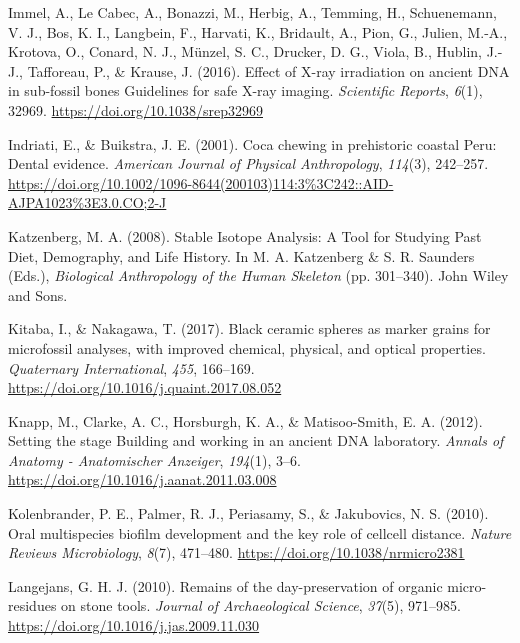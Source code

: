 \documentclass[
  b5paper,
]{book}
\newlength{\cslhangindent}
\newlength{\cslentryspacingunit} %
\newenvironment{CSLReferences}[2] %
 {%
  \setlength{\parindent}{0pt}
  \ifodd #1
  \let\oldpar\par
  \def\par{\hangindent=\cslhangindent\oldpar}
  \fi
  \setlength{\parskip}{#2\cslentryspacingunit}
 }%
 {}
\begin{document}
\begin{CSLReferences}{1}{0}
\leavevmode{}%
Immel, A., Le Cabec, A., Bonazzi, M., Herbig, A., Temming, H.,
Schuenemann, V. J., Bos, K. I., Langbein, F., Harvati, K., Bridault, A.,
Pion, G., Julien, M.-A., Krotova, O., Conard, N. J., Münzel, S. C.,
Drucker, D. G., Viola, B., Hublin, J.-J., Tafforeau, P., \& Krause, J.
(2016). Effect of {X-ray} irradiation on ancient {DNA} in sub-fossil
bones {\textendash} {Guidelines} for safe {X-ray} imaging.
\emph{Scientific Reports}, \emph{6}(1), 32969.
\url{https://doi.org/10.1038/srep32969}

\leavevmode{}%
Indriati, E., \& Buikstra, J. E. (2001). Coca chewing in prehistoric
coastal {Peru}: {Dental} evidence. \emph{American Journal of Physical
Anthropology}, \emph{114}(3), 242--257.
\url{https://doi.org/10.1002/1096-8644(200103)114:3\%3C242::AID-AJPA1023\%3E3.0.CO;2-J}

\leavevmode{}%
Katzenberg, M. A. (2008). Stable {Isotope Analysis}: {A Tool} for
{Studying Past Diet}, {Demography}, and {Life History}. In M. A.
Katzenberg \& S. R. Saunders (Eds.), \emph{Biological {Anthropology} of
the {Human Skeleton}} (pp. 301--340). {John Wiley and Sons}.

\leavevmode{}%
Kitaba, I., \& Nakagawa, T. (2017). Black ceramic spheres as marker
grains for microfossil analyses, with improved chemical, physical, and
optical properties. \emph{Quaternary International}, \emph{455},
166--169. \url{https://doi.org/10.1016/j.quaint.2017.08.052}

\leavevmode{}%
Knapp, M., Clarke, A. C., Horsburgh, K. A., \& Matisoo-Smith, E. A.
(2012). Setting the stage {\textendash} {Building} and working in an
ancient {DNA} laboratory. \emph{Annals of Anatomy - Anatomischer
Anzeiger}, \emph{194}(1), 3--6.
\url{https://doi.org/10.1016/j.aanat.2011.03.008}

\leavevmode{}%
Kolenbrander, P. E., Palmer, R. J., Periasamy, S., \& Jakubovics, N. S.
(2010). Oral multispecies biofilm development and the key role of
cell{\textendash}cell distance. \emph{Nature Reviews Microbiology},
\emph{8}(7), 471--480. \url{https://doi.org/10.1038/nrmicro2381}

\leavevmode{}%
Langejans, G. H. J. (2010). Remains of the day-preservation of organic
micro-residues on stone tools. \emph{Journal of Archaeological Science},
\emph{37}(5), 971--985. \url{https://doi.org/10.1016/j.jas.2009.11.030}


\end{CSLReferences}
\end{document}
